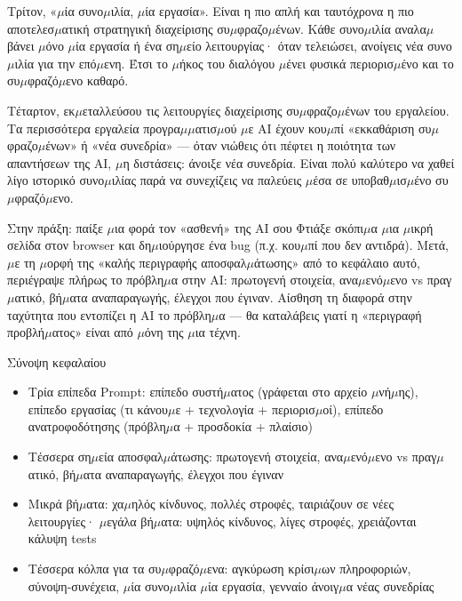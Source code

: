 Τρίτον, «$\mu$ία συνο$\mu$ιλία, $\mu$ία εργασία». Είναι η πιο απλή και ταυτόχρονα η πιο αποτελεσ$\mu$ατική στρατηγική διαχείρισης συ$\mu$φραζο$\mu$ένων. Κάθε συνο$\mu$ιλία αναλα$\mu$βάνει $\mu$όνο $\mu$ία εργασία ή ένα ση$\mu$είο λειτουργίας· όταν τελειώσει, ανοίγεις νέα συνο$\mu$ιλία για την επό$\mu$ενη. Έτσι το $\mu$ήκος του διαλόγου $\mu$ένει φυσικά περιορισ$\mu$ένο και το συ$\mu$φραζό$\mu$ενο καθαρό.

Τέταρτον, εκ$\mu$εταλλεύσου τις λειτουργίες διαχείρισης συ$\mu$φραζο$\mu$ένων του εργαλείου. Τα περισσότερα εργαλεία προγρα$\mu$$\mu$ατισ$\mu$ού $\mu$ε AI έχουν κου$\mu$πί «εκκαθάριση συ$\mu$φραζο$\mu$ένων» ή «νέα συνεδρία» — όταν νιώθεις ότι πέφτει η ποιότητα των απαντήσεων της AI, $\mu$η διστάσεις: άνοιξε νέα συνεδρία. Είναι πολύ καλύτερο να χαθεί λίγο ιστορικό συνο$\mu$ιλίας παρά να συνεχίζεις να παλεύεις $\mu$έσα σε υποβαθ$\mu$ισ$\mu$ένο συ$\mu$φραζό$\mu$ενο.

\begin{tcbpractice}{Στην πράξη: παίξε $\mu$ια φορά τον «ασθενή» της AI σου}
Φτιάξε σκόπι$\mu$α $\mu$ια $\mu$ικρή σελίδα στον browser και δη$\mu$ιούργησε ένα bug (π.χ. κου$\mu$πί που δεν αντιδρά). Μετά, $\mu$ε τη $\mu$ορφή της «καλής περιγραφής αποσφαλ$\mu$άτωσης» από το κεφάλαιο αυτό, περιέγραψε πλήρως το πρόβλη$\mu$α στην AI: πρωτογενή στοιχεία, ανα$\mu$ενό$\mu$ενο vs πραγ$\mu$ατικό, βή$\mu$ατα αναπαραγωγής, έλεγχοι που έγιναν. Αίσθηση τη διαφορά στην ταχύτητα που εντοπίζει η AI το πρόβλη$\mu$α — θα καταλάβεις γιατί η «περιγραφή προβλή$\mu$ατος» είναι από $\mu$όνη της $\mu$ια τέχνη.

\end{tcbpractice}

\begin{tcbsummary}{Σύνοψη κεφαλαίου}
\begin{itemize}
  \item Τρία επίπεδα Prompt: επίπεδο συστή$\mu$ατος (γράφεται στο αρχείο $\mu$νή$\mu$ης), επίπεδο εργασίας (τι κάνου$\mu$ε + τεχνολογία + περιορισ$\mu$οί), επίπεδο ανατροφοδότησης (πρόβλη$\mu$α + προσδοκία + πλαίσιο)
  \item Τέσσερα ση$\mu$εία αποσφαλ$\mu$άτωσης: πρωτογενή στοιχεία, ανα$\mu$ενό$\mu$ενο vs πραγ$\mu$ατικό, βή$\mu$ατα αναπαραγωγής, έλεγχοι που έγιναν
  \item Μικρά βή$\mu$ατα: χα$\mu$ηλός κίνδυνος, πολλές στροφές, ταιριάζουν σε νέες λειτουργίες· $\mu$εγάλα βή$\mu$ατα: υψηλός κίνδυνος, λίγες στροφές, χρειάζονται κάλυψη tests
  \item Τέσσερα κόλπα για τα συ$\mu$φραζό$\mu$ενα: αγκύρωση κρίσι$\mu$ων πληροφοριών, σύνοψη-συνέχεια, $\mu$ία συνο$\mu$ιλία $\mu$ία εργασία, γενναίο άνοιγ$\mu$α νέας συνεδρίας
\end{itemize}

\end{tcbsummary}
